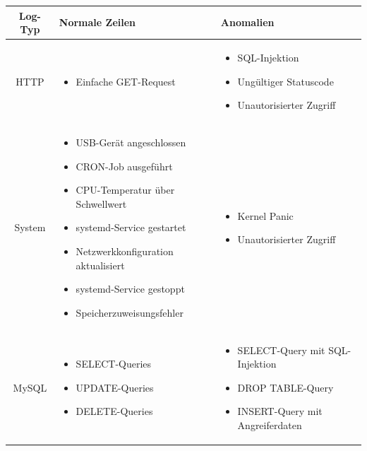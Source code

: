 \documentclass[a4paper,12pt]{report}
\begin{document}
    \begin{table}[h!]
        \centering
        \setlength{\leftmargini}{0.4cm}
        \begin{tabular}{|c|p{6cm}|p{6cm}|}
            \hline
            \textbf{Log-Typ} & \textbf{Normale Zeilen} & \textbf{Anomalien} \\ \hline
            \textnormal{HTTP} &
            \begin{itemize}
                \item Einfache GET-Request
            \end{itemize} &
            \begin{itemize}
                \item SQL-Injektion
                \item Ungültiger Statuscode
                \item Unautorisierter Zugriff
            \end{itemize} \\ \hline

            \textnormal{System} &
            \begin{itemize}
                \item USB-Gerät angeschlossen
                \item CRON-Job ausgeführt
                \item CPU-Temperatur über Schwellwert
                \item systemd-Service gestartet
                \item Netzwerkkonfiguration aktualisiert
                \item systemd-Service gestoppt
                \item Speicherzuweisungsfehler
            \end{itemize} &
            \begin{itemize}
                \item Kernel Panic
                \item Unautorisierter Zugriff
            \end{itemize} \\ \hline

            \textnormal{MySQL} &
            \begin{itemize}
                \item SELECT-Queries
                \item UPDATE-Queries
                \item DELETE-Queries
            \end{itemize} &
            \begin{itemize}
                \item SELECT-Query mit SQL-Injektion
                \item DROP TABLE-Query
                \item INSERT-Query mit Angreiferdaten
            \end{itemize} \\ \hline


\end{tabular}
\end{table}
\end{document}
